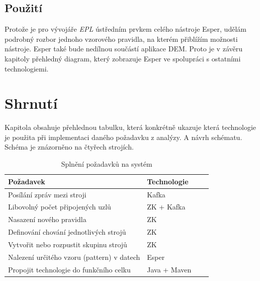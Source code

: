 \documentclass[
  digital, %
  table,   %
  nolof,     %
  nolot,     %
  oneside, %
  nocover,
  monochrome,
  12pt
]{fithesis3}
\begin{document}
\subsection*{Použití}
Protože je pro vývojáře \textit{EPL} ústředním prvkem celého nástroje Esper, udělám podrobný rozbor jednoho vzorového pravidla, na kterém přiblížím možnosti nástroje. Esper také bude nedílnou součástí aplikace DEM. Proto je v závěru kapitoly přehledný diagram, který zobrazuje Esper ve spolupráci s ostatními technologiemi.


\section{Shrnutí}
Kapitola obsahuje přehlednou tabulku, která konkrétně ukazuje která technologie je použita při implementaci daného požadavku z analýzy. A návrh schématu. Schéma je znázorněno na čtyřech strojích.

\begin{table}[H]
  \centering
  \begin{tabularx}{\textwidth}{lllX}
    \toprule
    Požadavek & Technologie \\
    \midrule
    Posílání zpráv mezi stroji & Kafka \\
    Libovolný počet připojených uzlů & ZK + Kafka \\
    Nasazení nového pravidla & ZK \\
    Definování chování jednotlivých strojů & ZK \\
    Vytvořit nebo rozpustit skupinu strojů & ZK \\
    Nalezení určitého vzoru (pattern) v datech & Esper \\
    Propojit technologie do funkčního celku & Java + Maven \\
    \bottomrule
  \end{tabularx}
  \caption{Splnění požadavků na systém}
  \label{tab:fulfill-usecases}
\end{table}
\end{document}
